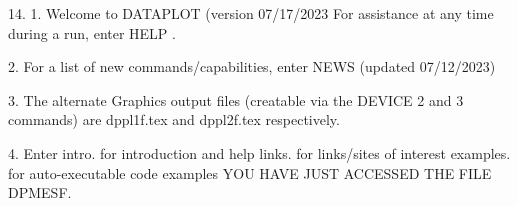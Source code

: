 14.
1. Welcome to DATAPLOT (version 07/17/2023  For assistance at
   any time during a run, enter HELP   .

2. For a list of new commands/capabilities,
   enter NEWS  (updated 07/12/2023)

3. The alternate Graphics output files (creatable
   via the DEVICE 2 and 3 commands) are
   dppl1f.tex and dppl2f.tex respectively.

4. Enter  intro.     for introduction and help
          links.     for links/sites of interest
          examples.  for auto-executable code examples
YOU HAVE JUST ACCESSED THE FILE DPMESF.
